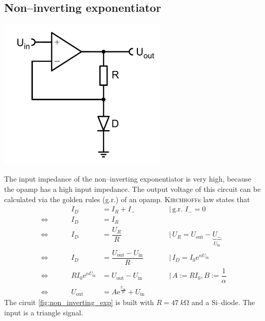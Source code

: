 \documentclass[a4paper,10pt]{article}
\newenvironment{Figure}
        {\par\medskip\noindent\minipage{\linewidth}}
        {\endminipage\par\medskip} %
\numberwithin{equation}{section}
\begin{document}
\begin{multicols}{2}
        \subsection{Non--inverting exponentiator}
        \begin{Figure}
                \centering
                \includegraphics[width=0.6\textwidth]{non_inverting_exp.png} \label{fig:non_inverting_exp}
        \end{Figure}
        \noindent The input impedance of the non--inverting exponentiator is very high, because the opamp has a high input impedance.
        The output voltage of this circuit can be calculated via the golden rules (g.r.) of an opamp.
        \textsc{Kirchhoff}s law states that
        \begin{align} 
                 &&&& I_D &= I_R+I_- &&&& \,|\, \text{g.r. }I_-=0\\
                 \Leftrightarrow  &&&& I_D &= I_R &&&& \\
                 \Leftrightarrow  &&&& I_D &= \dfrac{U_R}{R} &&&& \,|\, U_R=U_\text{out}-\underbrace{U_-}_{U_\text{in}}\\
                 \Leftrightarrow  &&&& I_D &= \dfrac{U_\text{out}-U_\text{in}}{R} &&&& \,|\, I_D=I_0\text{e}^{\alpha U_\text{in}}\\
                 \Leftrightarrow  &&&& RI_0\text{e}^{\alpha U_\text{in}} &= U_\text{out}-U_\text{in} &&&& \,|\, A:=RI_0,B:=\dfrac{1}{\alpha }\\
                 \Leftrightarrow  &&&& U_\text{out} &= A\text{e}^{\tfrac{U_\text{in}}{B}}+U_\text{in} &&&& 
        \end{align} 
        The ciruit \ref{fig:non_inverting_exp} is built with $R=\SI{47}{k\ohm}$ and a Si--diode. 
        The input is a triangle signal.

\end{multicols}
\end{document}
